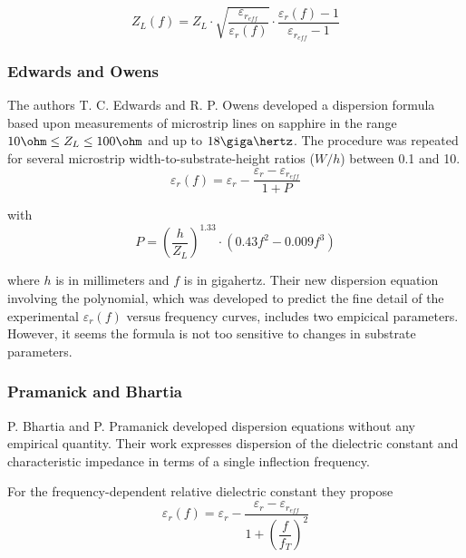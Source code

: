 \begin{equation}
Z_{L}(f) = Z_{L}\cdot\sqrt{\frac{\varepsilon_{r_{eff}}}{\varepsilon_{r}(f)}}\cdot\frac{\varepsilon_{r}(f) - 1}{\varepsilon_{r_{eff}} - 1}
\end{equation}

\subsubsection{Edwards and Owens}

The authors T. C. Edwards and R. P. Owens \cite{Edwards2} developed a
dispersion formula based upon measurements of microstrip lines on
sapphire in the range $10\ohm \le Z_L \le 100\ohm$ and up to
$18\giga\hertz$.  The procedure was repeated for several microstrip
width-to-substrate-height ratios ($W/h$) between 0.1 and 10.
\begin{equation}
\varepsilon_{r}(f) = \varepsilon_{r} - \dfrac{\varepsilon_{r} - \varepsilon_{r_{eff}}}{1 + P}
\end{equation}

with
\begin{equation}
P = \left(\dfrac{h}{Z_{L}}\right)^{1.33}\cdot\left(0.43 f^2 - 0.009 f^3\right)
\end{equation}

where $h$ is in millimeters and $f$ is in gigahertz.  Their new
dispersion equation involving the polynomial, which was developed to
predict the fine detail of the experimental $\varepsilon_{r}(f)$
versus frequency curves, includes two empicical parameters.  However,
it seems the formula is not too sensitive to changes in substrate
parameters.

\subsubsection{Pramanick and Bhartia}

P. Bhartia and P. Pramanick \cite{Pramanick1} developed dispersion
equations without any empirical quantity.  Their work expresses
dispersion of the dielectric constant and characteristic impedance in
terms of a single inflection frequency.

\addvspace{12pt}

For the frequency-dependent relative dielectric constant they propose
\begin{equation}
\varepsilon_{r}(f) = \varepsilon_{r} - \dfrac{\varepsilon_{r} - \varepsilon_{r_{eff}}}{1 + \left(\dfrac{f}{f_T}\right)^2}
\end{equation}

